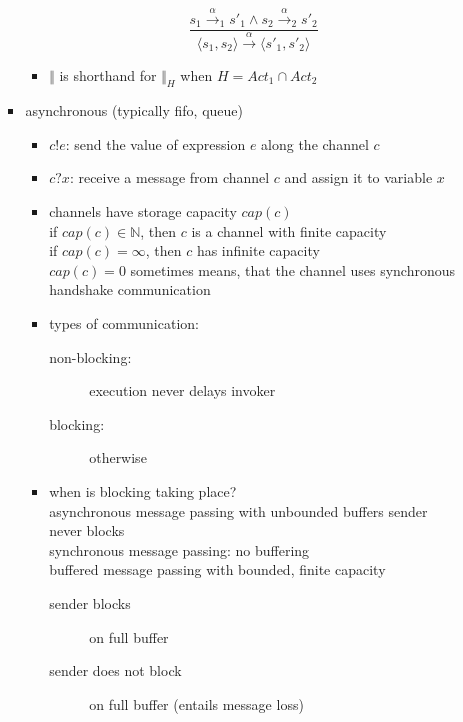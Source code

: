 \documentclass[a4paper, 10pt]{article}
\begin{document}
\begin{itemize}
\begin{itemize}
\begin{itemize}
\begin{shaded}
\begin{itemize}
                    \[
                    \frac{
                    s_1 \overset{\alpha}{\longrightarrow}_1 s'_1 \wedge s_2 \overset{\alpha}{\longrightarrow}_2 s'_2
                    }{
                    \langle s_1,s_2 \rangle \overset{\alpha}{\longrightarrow} \langle s'_1,s'_2 \rangle
                    }
                    \]
                    \item $\Vert$ is shorthand for $\Vert_H$ when $H=Act_1\cap Act_2$
                \end{itemize}
            \end{shaded}
            \item asynchronous (typically fifo, queue)
            \begin{itemize}
                \item $c!e$: send the value of expression $e$ along the channel $c$
                \item $c?x$: receive a message from channel $c$ and assign it to variable $x$
                \item channels have storage capacity $cap(c)$
                    \\ if $cap(c)\in\mathbb{N}$, then $c$ is a channel with finite capacity
                    \\ if $cap(c)=\infty$, then $c$ has infinite capacity
                    \\ $cap(c)=0$ sometimes means, that the channel uses synchronous handshake communication
                \item types of communication:
                \begin{description}
                    \item[non-blocking:] execution never delays invoker
                    \item[blocking:] otherwise
                \end{description}
                \item when is blocking taking place?
                    \\ asynchronous message passing with unbounded buffers \follows \; sender never blocks
                    \\ synchronous message passing: no buffering
                    \\ buffered message passing with bounded, finite capacity
                    \begin{description}
                        \item[sender blocks] on full buffer
                        \item[sender does not block] on full buffer (entails message loss)
                    \end{description}
            \end{itemize}
        \end{itemize}
    \end{itemize}
\end{itemize}
\end{document}
